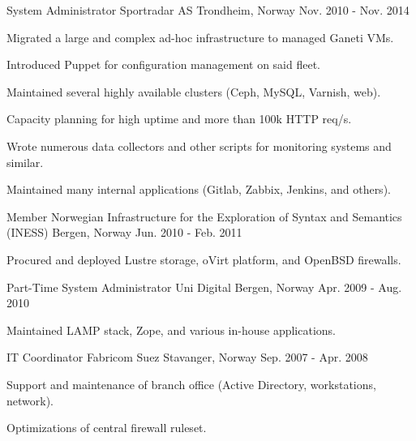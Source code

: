 \begin{cventries}
  \cventry
    {System Administrator} %
    {Sportradar AS} %
    {Trondheim, Norway} %
    {Nov. 2010 - Nov. 2014} %
    {
      \begin{cvitems} %
        \item {Migrated a large and complex ad-hoc infrastructure to managed Ganeti VMs.}
        \item {Introduced Puppet for configuration management on said fleet.}
        \item {Maintained several highly available clusters (Ceph, MySQL, Varnish, web).}
        \item {Capacity planning for high uptime and more than 100k HTTP req/s.}
        \item {Wrote numerous data collectors and other scripts for monitoring systems and similar.}
        \item {Maintained many internal applications (Gitlab, Zabbix, Jenkins, and others).}
      \end{cvitems}
    }

  \cventry
    {Member} %
    {Norwegian Infrastructure for the Exploration of Syntax and Semantics (INESS)} %
    {Bergen, Norway} %
    {Jun. 2010 - Feb. 2011} %
    {
      \begin{cvitems} %
        \item {Procured and deployed Lustre storage, oVirt platform, and OpenBSD firewalls.}
      \end{cvitems}
    }

  \cventry
    {Part-Time System Administrator} %
    {Uni Digital} %
    {Bergen, Norway} %
    {Apr. 2009 - Aug. 2010} %
    {
      \begin{cvitems} %
        \item {Maintained LAMP stack, Zope, and various in-house applications.}
      \end{cvitems}
    }

  \cventry
    {IT Coordinator} %
    {Fabricom Suez} %
    {Stavanger, Norway} %
    {Sep. 2007 - Apr. 2008} %
    {
      \begin{cvitems} %
        \item {Support and maintenance of branch office (Active Directory, workstations, network).}
        \item {Optimizations of central firewall ruleset.}
      \end{cvitems}
    }


\end{cventries}
